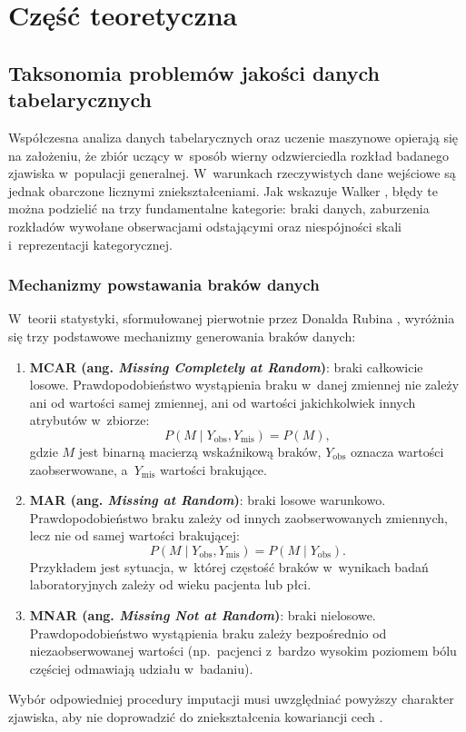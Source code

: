 \chapter{Część teoretyczna}

\section{Taksonomia problemów jakości danych tabelarycznych}
Współczesna analiza danych tabelarycznych oraz uczenie maszynowe opierają się na założeniu, że zbiór uczący w~sposób wierny odzwierciedla rozkład badanego zjawiska w~populacji generalnej. W~warunkach rzeczywistych dane wejściowe są jednak obarczone licznymi zniekształceniami. Jak wskazuje Walker \cite{Walker2021}, błędy te można podzielić na trzy fundamentalne kategorie: braki danych, zaburzenia rozkładów wywołane obserwacjami odstającymi oraz niespójności skali i~reprezentacji kategorycznej.

\subsection{Mechanizmy powstawania braków danych}
W~teorii statystyki, sformułowanej pierwotnie przez Donalda Rubina \cite{LittleRubin2002}, wyróżnia się trzy podstawowe mechanizmy generowania braków danych:
\begin{enumerate}
    \item \textbf{MCAR (ang. \textit{Missing Completely at Random})}: braki całkowicie losowe. Prawdopodobieństwo wystąpienia braku w~danej zmiennej nie zależy ani od wartości samej zmiennej, ani od wartości jakichkolwiek innych atrybutów w~zbiorze:
    \begin{equation}
    P(M \mid Y_{\text{obs}}, Y_{\text{mis}}) = P(M),
    \end{equation}
    gdzie $M$ jest binarną macierzą wskaźnikową braków, $Y_{\text{obs}}$ oznacza wartości zaobserwowane, a~$Y_{\text{mis}}$ wartości brakujące.
    \item \textbf{MAR (ang. \textit{Missing at Random})}: braki losowe warunkowo. Prawdopodobieństwo braku zależy od innych zaobserwowanych zmiennych, lecz nie od samej wartości brakującej:
    \begin{equation}
    P(M \mid Y_{\text{obs}}, Y_{\text{mis}}) = P(M \mid Y_{\text{obs}}).
    \end{equation}
    Przykładem jest sytuacja, w~której częstość braków w~wynikach badań laboratoryjnych zależy od wieku pacjenta lub płci.
    \item \textbf{MNAR (ang. \textit{Missing Not at Random})}: braki nielosowe. Prawdopodobieństwo wystąpienia braku zależy bezpośrednio od niezaobserwowanej wartości (np.~pacjenci z~bardzo wysokim poziomem bólu częściej odmawiają udziału w~badaniu).
\end{enumerate}
Wybór odpowiedniej procedury imputacji musi uwzględniać powyższy charakter zjawiska, aby nie doprowadzić do zniekształcenia kowariancji cech \cite{LittleRubin2002,Walker2021}.

